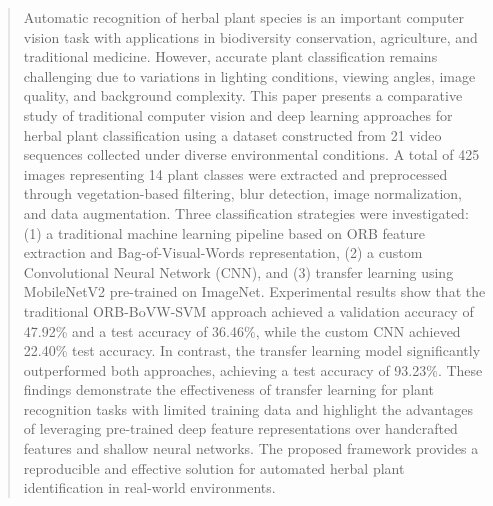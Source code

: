 \begin{abstract}

Automatic recognition of herbal plant species is an important computer vision task with applications in biodiversity conservation, agriculture, and traditional medicine. However, accurate plant classification remains challenging due to variations in lighting conditions, viewing angles, image quality, and background complexity. This paper presents a comparative study of traditional computer vision and deep learning approaches for herbal plant classification using a dataset constructed from 21 video sequences collected under diverse environmental conditions. A total of 425 images representing 14 plant classes were extracted and preprocessed through vegetation-based filtering, blur detection, image normalization, and data augmentation. Three classification strategies were investigated: (1) a traditional machine learning pipeline based on ORB feature extraction and Bag-of-Visual-Words representation, (2) a custom Convolutional Neural Network (CNN), and (3) transfer learning using MobileNetV2 pre-trained on ImageNet. Experimental results show that the traditional ORB-BoVW-SVM approach achieved a validation accuracy of 47.92\% and a test accuracy of 36.46\%, while the custom CNN achieved 22.40\% test accuracy. In contrast, the transfer learning model significantly outperformed both approaches, achieving a test accuracy of 93.23\%. These findings demonstrate the effectiveness of transfer learning for plant recognition tasks with limited training data and highlight the advantages of leveraging pre-trained deep feature representations over handcrafted features and shallow neural networks. The proposed framework provides a reproducible and effective solution for automated herbal plant identification in real-world environments.

\end{abstract}
